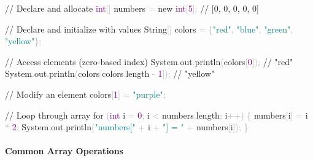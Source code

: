 \documentclass[
  justified,
  openright,
]{tufte-book}
\let\subsubsection\paragraph
\let\paragraph\paragraph
\newcommand{\BuiltInTok}[1]{#1}
\newcommand{\CommentTok}[1]{\textcolor{MidGray}{#1}}
\newcommand{\ControlFlowTok}[1]{\textcolor{BrandBlue}{#1}}
\newcommand{\DataTypeTok}[1]{\textcolor{Purple}{#1}}
\newcommand{\DecValTok}[1]{\textcolor{Purple}{#1}}
\newcommand{\FunctionTok}[1]{\textcolor{BrandBlue}{#1}}
\newcommand{\KeywordTok}[1]{\textcolor{BrandBlue}{#1}}
\newcommand{\NormalTok}[1]{#1}
\newcommand{\OperatorTok}[1]{\textcolor{DarkGray}{#1}}
\newcommand{\StringTok}[1]{\textcolor{Teal}{#1}}
\newenvironment{Shaded}{%
  \begin{snugshade}
}{%
  \end{snugshade}
}
\let\subsubsection\paragraph
\let\paragraph\paragraph
\begin{document}
\begin{Shaded}
\begin{Highlighting}[]
\CommentTok{// Declare and allocate}
\DataTypeTok{int}\OperatorTok{[]}\NormalTok{ numbers }\OperatorTok{=} \KeywordTok{new} \DataTypeTok{int}\OperatorTok{[}\DecValTok{5}\OperatorTok{];}            \CommentTok{// [0, 0, 0, 0, 0]}

\CommentTok{// Declare and initialize with values}
\BuiltInTok{String}\OperatorTok{[]}\NormalTok{ colors }\OperatorTok{=} \OperatorTok{\{}\StringTok{"red"}\OperatorTok{,} \StringTok{"blue"}\OperatorTok{,} \StringTok{"green"}\OperatorTok{,} \StringTok{"yellow"}\OperatorTok{\};}

\CommentTok{// Access elements (zero{-}based index)}
\BuiltInTok{System}\OperatorTok{.}\FunctionTok{out}\OperatorTok{.}\FunctionTok{println}\OperatorTok{(}\NormalTok{colors}\OperatorTok{[}\DecValTok{0}\OperatorTok{]);}         \CommentTok{// "red"}
\BuiltInTok{System}\OperatorTok{.}\FunctionTok{out}\OperatorTok{.}\FunctionTok{println}\OperatorTok{(}\NormalTok{colors}\OperatorTok{[}\NormalTok{colors}\OperatorTok{.}\FunctionTok{length} \OperatorTok{{-}} \DecValTok{1}\OperatorTok{]);}  \CommentTok{// "yellow"}

\CommentTok{// Modify an element}
\NormalTok{colors}\OperatorTok{[}\DecValTok{1}\OperatorTok{]} \OperatorTok{=} \StringTok{"purple"}\OperatorTok{;}

\CommentTok{// Loop through array}
\ControlFlowTok{for} \OperatorTok{(}\DataTypeTok{int}\NormalTok{ i }\OperatorTok{=} \DecValTok{0}\OperatorTok{;}\NormalTok{ i }\OperatorTok{\textless{}}\NormalTok{ numbers}\OperatorTok{.}\FunctionTok{length}\OperatorTok{;}\NormalTok{ i}\OperatorTok{++)} \OperatorTok{\{}
\NormalTok{    numbers}\OperatorTok{[}\NormalTok{i}\OperatorTok{]} \OperatorTok{=}\NormalTok{ i }\OperatorTok{*} \DecValTok{2}\OperatorTok{;}
    \BuiltInTok{System}\OperatorTok{.}\FunctionTok{out}\OperatorTok{.}\FunctionTok{println}\OperatorTok{(}\StringTok{"numbers["} \OperatorTok{+}\NormalTok{ i }\OperatorTok{+} \StringTok{"] = "} \OperatorTok{+}\NormalTok{ numbers}\OperatorTok{[}\NormalTok{i}\OperatorTok{]);}
\OperatorTok{\}}
\end{Highlighting}
\end{Shaded}

\subsubsection{Common Array Operations}\label{common-array-operations}
\end{document}
